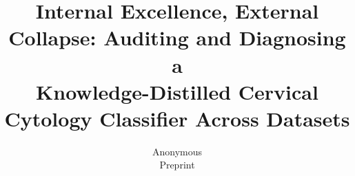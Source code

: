 \documentclass[10pt,twocolumn,letterpaper]{article}
\title{Internal Excellence, External Collapse: Auditing and Diagnosing a\\
Knowledge-Distilled Cervical Cytology Classifier Across Datasets}
\author{Anonymous\\ Preprint}
\begin{document}
\maketitle













\appendix


{\small


}
\end{document}
